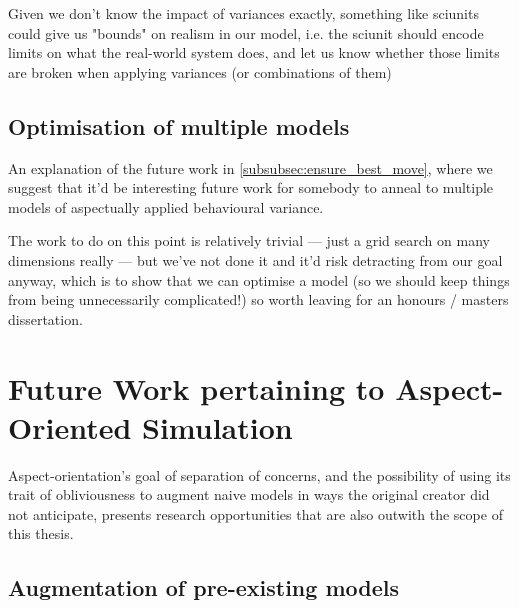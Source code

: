 Given we don't know the impact of variances exactly, something like sciunits
could give us "bounds" on realism in our model, i.e. the sciunit should encode
limits on what the real-world system does, and let us know whether those limits
are broken when applying variances (or combinations of them)


\subsection{Optimisation of multiple models}\label{many_aspectual_models_to_optimise}

An explanation of the future work in \cref{subsubsec:ensure_best_move}, where we
suggest that it'd be interesting future work for somebody to anneal to multiple
models of aspectually applied behavioural variance. 

The work to do on this point is relatively trivial --- just a grid search on
many dimensions really --- but we've not done it and it'd risk detracting from
our goal anyway, which is to show that we can optimise a model (so we should
keep things from being unnecessarily complicated!) so worth leaving for an
honours / masters dissertation.



\section{Future Work pertaining to Aspect-Oriented Simulation}\label{sec:future_work_simulations}

Aspect-orientation's goal of separation of concerns, and the possibility of
using its trait of obliviousness to augment naive models in ways the original
creator did not anticipate, presents research opportunities that are also
outwith the scope of this thesis.

\subsection{Augmentation of pre-existing models}

